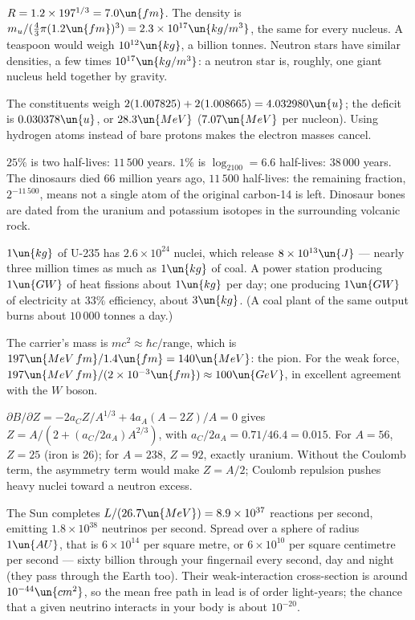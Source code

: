 
 $R = 1.2\times197^{1/3} = 7.0\un{fm}$. The density is $m_u/(\tfrac43\pi(1.2\un{fm})^3) = 2.3\times10^{17}\un{kg/m^3}$, the same for every nucleus. A teaspoon would weigh $10^{12}\un{kg}$, a billion tonnes. Neutron stars have similar densities, a few times $10^{17}\un{kg/m^3}$: a neutron star is, roughly, one giant nucleus held together by gravity.

 The constituents weigh $2(1.007825) + 2(1.008665) = 4.032980\un{u}$; the deficit is $0.030378\un{u}$, or $28.3\un{MeV}$ ($7.07\un{MeV}$ per nucleon). Using hydrogen atoms instead of bare protons makes the electron masses cancel.

 $25\%$ is two half-lives: $11\,500$ years. $1\%$ is $\log_2100 = 6.6$ half-lives: $38\,000$ years. The dinosaurs died $66$ million years ago, $11\,500$ half-lives: the remaining fraction, $2^{-11\,500}$, means not a single atom of the original carbon-14 is left. Dinosaur bones are dated from the uranium and potassium isotopes in the surrounding volcanic rock.

 $1\un{kg}$ of U-235 has $2.6\times10^{24}$ nuclei, which release $8\times10^{13}\un{J}$ --- nearly three million times as much as $1\un{kg}$ of coal. A power station producing $1\un{GW}$ of heat fissions about $1\un{kg}$ per day; one producing $1\un{GW}$ of electricity at $33\%$ efficiency, about $3\un{kg}$. (A coal plant of the same output burns about $10\,000$ tonnes a day.)

 The carrier's mass is $mc^2\approx\hbar c/\text{range}$, which is $197\un{MeV\,fm}/1.4\un{fm} = 140\un{MeV}$: the pion. For the weak force, $197\un{MeV\,fm}/(2\times10^{-3}\un{fm})\approx100\un{GeV}$, in excellent agreement with the $W$ boson.

 $\partial B/\partial Z = -2a_CZ/A^{1/3} + 4a_A(A-2Z)/A = 0$ gives $Z = A/(2 + (a_C/2a_A)A^{2/3})$, with $a_C/2a_A = 0.71/46.4 = 0.015$. For $A = 56$, $Z = 25$ (iron is $26$); for $A = 238$, $Z = 92$, exactly uranium. Without the Coulomb term, the asymmetry term would make $Z = A/2$; Coulomb repulsion pushes heavy nuclei toward a neutron excess.

 The Sun completes $L/(26.7\un{MeV}) = 8.9\times10^{37}$ reactions per second, emitting $1.8\times10^{38}$ neutrinos per second. Spread over a sphere of radius $1\un{AU}$, that is $6\times10^{14}$ per square metre, or $6\times10^{10}$ per square centimetre per second --- sixty billion through your fingernail every second, day and night (they pass through the Earth too). Their weak-interaction cross-section is around $10^{-44}\un{cm^2}$, so the mean free path in lead is of order light-years; the chance that a given neutrino interacts in your body is about $10^{-20}$.

